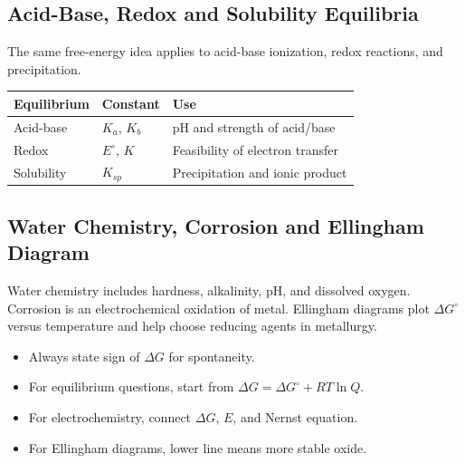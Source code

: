 \documentclass[12pt,a4paper]{article}
\begin{document}
\subsection{Acid-Base, Redox and Solubility Equilibria}
The same free-energy idea applies to acid-base ionization, redox reactions, and precipitation.

\begin{tabularx}{\linewidth}{|B{3.2cm}|Y|Y|}
\hline
\textbf{Equilibrium} & \textbf{Constant} & \textbf{Use} \\
\hline
Acid-base & $K_a$, $K_b$ & pH and strength of acid/base \\
\hline
Redox & $E^\circ$, $K$ & Feasibility of electron transfer \\
\hline
Solubility & $K_{sp}$ & Precipitation and ionic product \\
\hline
\end{tabularx}

\subsection{Water Chemistry, Corrosion and Ellingham Diagram}
Water chemistry includes hardness, alkalinity, pH, and dissolved oxygen. Corrosion is an electrochemical oxidation of metal. Ellingham diagrams plot $\Delta G^\circ$ versus temperature and help choose reducing agents in metallurgy.

\begin{tcolorbox}[tikzbox, title={Ellingham Diagram Concept}]
\centering
{}
\end{tcolorbox}

\begin{tcolorbox}[exambox, title={Exam Points}]
\begin{itemize}[leftmargin=*, itemsep=2pt, topsep=2pt]
  \item Always state sign of $\Delta G$ for spontaneity.
  \item For equilibrium questions, start from $\Delta G=\Delta G^\circ+RT\ln Q$.
  \item For electrochemistry, connect $\Delta G$, $E$, and Nernst equation.
  \item For Ellingham diagrams, lower line means more stable oxide.
\end{itemize}
\end{tcolorbox}
\end{document}
